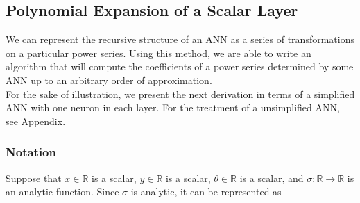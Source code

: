 
\subsection{Polynomial Expansion of a Scalar Layer}
\label{sec:polynomial series scalar}

We can represent the recursive structure of an ANN as a series of transformations on a particular power series. Using this method, we are able to write an algorithm that will compute the coefficients of a power series determined by some ANN up to an arbitrary order of approximation.\\

For the sake of illustration, we present the next derivation in terms of a simplified ANN with one neuron in each layer. For the treatment of a unsimplified ANN, see Appendix.

\subsubsection{Notation}
Suppose that $x \in \mathbb{R}$ is a scalar, $y \in \mathbb{R}$ is a scalar, $\theta \in \mathbb{R}$ is a scalar, and $\sigma: \mathbb{R} \to \mathbb{R}$ is an analytic function. Since $\sigma$ is analytic, it can be represented as

